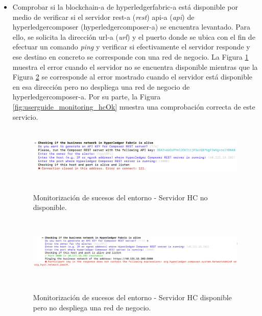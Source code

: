 \documentclass[12pt,a4paper, twoside]{report}
\begin{document}
\begin{itemize}
	 	\newpage 
	 	
	 	\item Comprobar si la \gls{blockchain-a} de \gls{hyperledgerfabric-a} está disponible por medio de verificar si el servidor \gls{rest-a} (\textit{\gls{rest}}) \gls{api-a} (\textit{\gls{api}}) de \gls{hyperledgercomposer} (\gls{hyperledgercomposer-a}) se encuentra levantado. Para ello, se solicita la dirección \gls{url-a} (\textit{\gls{url}}) y el puerto donde se ubica con el fin de efectuar un comando \textit{ping} y verificar si efectivamente el servidor responde y ese destino en concreto se corresponde con una red de negocio. La Figura \ref{fig:userguide_monitoring_hcError} muestra el error cuando el servidor no se encuentra disponible mientras que la Figura \ref{fig:userguide_monitoring_hcBusiness} se corresponde al error mostrado cuando el servidor está disponible en esa dirección pero no despliega una red de negocio de \gls{hyperledgercomposer-a}. Por su parte, la Figura \ref{fig:userguide_monitoring_hcOk} muestra una comprobación correcta de este servicio. \\
	 	 
	 		 \begin{figure}[!ht]   
				\caption{Monitorización de sucesos del entorno - Servidor HC no disponible.} 
				\begin{center} 
					\includegraphics[width=16cm,height=2.8cm]{Images/userGuide/monitoring/hcError} \\
					\label{fig:userguide_monitoring_hcError} 
				\end{center}  
			\end{figure}	 
			
			 \begin{figure}[!ht]   
				\caption{Monitorización de sucesos del entorno - Servidor HC disponible pero no despliega una red de negocio.} 
				\begin{center} 
					\includegraphics[width=16cm,height=3.3cm]{Images/userGuide/monitoring/hcBusiness} \\
					\label{fig:userguide_monitoring_hcBusiness} 
				\end{center}  
			\end{figure}	 
			

\end{itemize}
\end{document}
